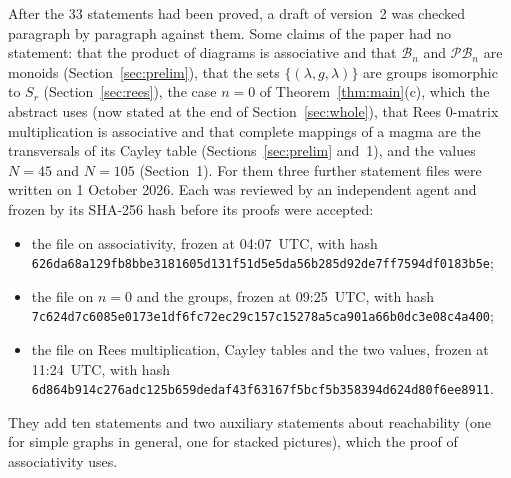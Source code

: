 \documentclass[11pt]{article}
\theoremstyle{remark}
\newcommand{\B}{\mathcal B}
\newcommand{\PB}{\mathcal{PB}}
\begin{document}
After the $33$ statements had been proved, a draft of version~2 was checked
paragraph by paragraph against them. Some claims of the paper had no
statement: that the product of diagrams is associative and that $\B_n$ and
$\PB_n$ are monoids (Section~\ref{sec:prelim}), that the sets
$\{(\lambda,g,\lambda)\}$ are groups isomorphic to $S_r$
(Section~\ref{sec:rees}), the case $n=0$ of Theorem~\ref{thm:main}(c), which
the abstract uses (now stated at the end of Section~\ref{sec:whole}), that Rees $0$-matrix
multiplication is associative and that complete mappings of a magma are the
transversals of its Cayley table (Sections~\ref{sec:prelim} and~1), and the
values $N=45$ and $N=105$ (Section~1). For them three further statement files
were written on 1 October 2026. Each was reviewed by an independent agent and
frozen by its SHA-256 hash before its proofs were accepted:
\begin{itemize}
\item the file on associativity, frozen at 04:07~UTC, with hash\newline
 \texttt{626da68a129fb8bbe3181605d131f51d5e5da56b285d92de7ff7594df0183b5e};
\item the file on $n=0$ and the groups, frozen at 09:25~UTC, with hash\newline
 \texttt{7c624d7c6085e0173e1df6fc72ec29c157c15278a5ca901a66b0dc3e08c4a400};
\item the file on Rees multiplication, Cayley tables and the two values, frozen
 at 11:24~UTC, with hash\newline
 \texttt{6d864b914c276adc125b659dedaf43f63167f5bcf5b358394d624d80f6ee8911}.
\end{itemize}
They add ten statements and two auxiliary statements about reachability (one
for simple graphs in general, one for stacked pictures), which the proof of
associativity uses.
\end{document}
